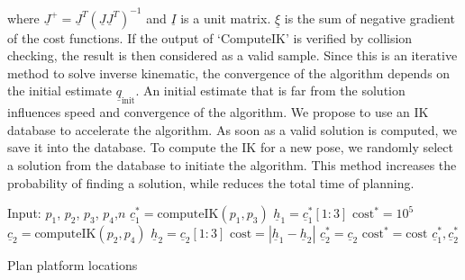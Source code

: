 where $\underline{J}^+ = \underline{J}^T(\underline{J}\underline{J}^T)^{-1}$ and $\underline{I}$ is a unit matrix. $\underline{\xi}$ is the sum of negative gradient of the cost functions. If the output of `ComputeIK' is verified by collision checking, the result is then considered as a valid sample. Since this is an iterative method to solve inverse kinematic, the convergence of the algorithm depends on the initial estimate $\underline{q}_{\text{init}}$. An initial estimate that is far from the solution influences speed and convergence of the algorithm. We propose to use an IK database to accelerate the algorithm. As soon as a valid solution is computed, we save it into the database. To compute the IK for a new pose, we randomly select a solution from the database to initiate the algorithm. This method increases the probability of finding a solution, while reduces the total time of planning.

\begin{algorithm}
\begin{algorithmic}[1] 
\STATE Input: $p_1$, $p_2$, $p_3$, $p_4$,$n$
\STATE $\underline{c}_1^{*} =  \text{computeIK}(p_1, p_3) $
\STATE $ \underline{h}_1 = \underline{c}_1^{*} [1:3] $
\STATE $ \text{cost}^* = 10^5 $
\STATE  $\underline{c}_2 = \text{computeIK}(p_2, p_4)$
\STATE   $\underline{h}_2 = \underline{c}_2 [1:3]$
\STATE   $\text{cost} = |\underline{h}_1 - \underline{h}_2|$
\STATE $\underline{c}_2^{*} = \underline{c}_2$
\STATE $\text{cost}^* = \text{cost} $
\ENDIF  
\ENDFOR 
\RETURN $ \underline{c}_1^{*} , \underline{c}_2^{*}$
\caption {Plan platform locations}
\label{algo:planplatform}
\end{algorithmic}
\end{algorithm}
 

